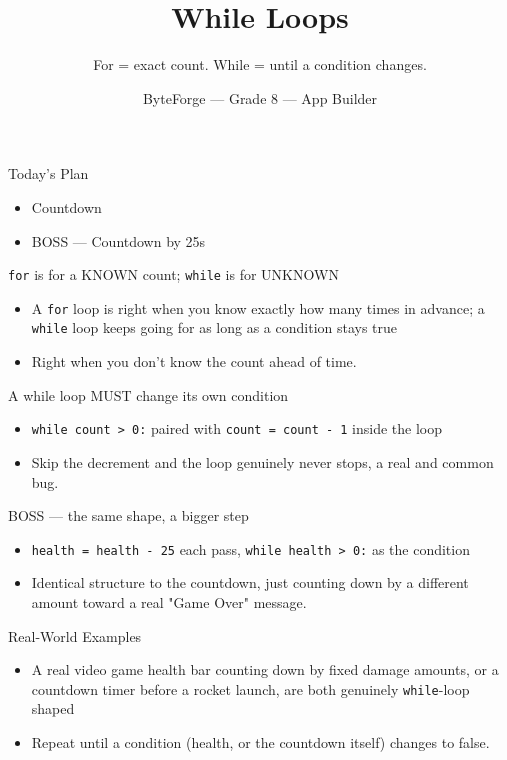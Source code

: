 \documentclass[aspectratio=169]{beamer}
\title{While Loops}
\subtitle{For = exact count. While = until a condition changes.}
\author{ByteForge --- Grade 8 --- App Builder}
\date{}
\begin{document}
\begin{frame}
    \titlepage
\end{frame}

\begin{frame}{Today's Plan}
    \begin{itemize}
        \item Countdown
        \item[$\bigstar$] BOSS --- Countdown by 25s
    \end{itemize}
\end{frame}

\begin{frame}{\texttt{for} is for a KNOWN count; \texttt{while} is for UNKNOWN}
    \large
    \begin{itemize}
        \item A \texttt{for} loop is right when you know exactly how many times in advance; a \texttt{while} loop keeps going for as long as a condition stays true
        \item Right when you don't know the count ahead of time.
    \end{itemize}
\end{frame}


\begin{frame}{A while loop MUST change its own condition}
    \large
    \begin{itemize}
        \item \texttt{while count > 0:} paired with \texttt{count = count - 1} inside the loop
        \item Skip the decrement and the loop genuinely never stops, a real and common bug.
    \end{itemize}
\end{frame}


\begin{frame}{BOSS — the same shape, a bigger step}
    \large
    \begin{itemize}
        \item \texttt{health = health - 25} each pass, \texttt{while health > 0:} as the condition
        \item Identical structure to the countdown, just counting down by a different amount toward a real "Game Over" message.
    \end{itemize}
\end{frame}

\begin{frame}{Real-World Examples}
    \large
    \begin{itemize}
        \item A real video game health bar counting down by fixed damage amounts, or a countdown timer before a rocket launch, are both genuinely \texttt{while}-loop shaped
        \item Repeat until a condition (health, or the countdown itself) changes to false.
    \end{itemize}
\end{frame}
\end{document}
